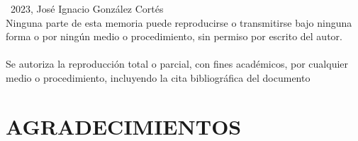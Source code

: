 \documentclass[spanish, a4paper, 12pt, twoside, openany,final]{book}
\numberwithin{equation}{section}
\begin{document}
\thispagestyle{empty}
\mbox{}                         %
\vfill                          %
\textcopyright\ 2023, José Ignacio González Cortés \\ %
Ninguna parte de esta memoria puede reproducirse o transmitirse bajo ninguna forma o por ningún medio o procedimiento, sin permiso por escrito del autor.\\\\
Se autoriza la reproducción total o parcial, con fines académicos, por cualquier medio o procedimiento, incluyendo la cita bibliográfica del documento
\vspace{1cm}    %
\restoregeometry %








\thispagestyle{empty}
\mbox{}
\vfill
\hfill {}

\restoregeometry









\newpage
{}  %
\section*{AGRADECIMIENTOS}                       %
\end{document}
